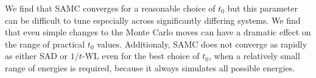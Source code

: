 \documentclass[letterpaper,twocolumn,amsmath,amssymb,pre,aps,10pt]{revtex4-1}
\begin{document}
We find that SAMC converges for a reasonable choice of
$t_0$ but this parameter can be difficult to tune especially across
significantly differing systems.  We find that even simple
changes to the Monte Carlo moves can have a dramatic effect on the
range of practical $t_0$ values.  Additionaly, SAMC does not
converge as rapidly as either SAD or $1/t$-WL even for the best choice of $t_0$,
when a relatively small range of energies is required, because it always
simulates all possible energies.




\end{document}
